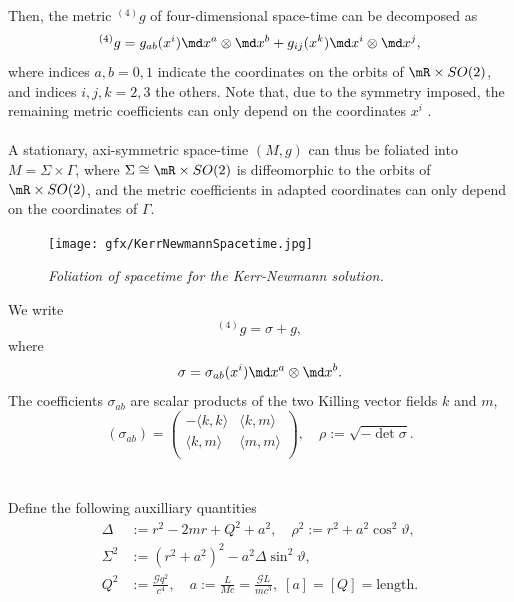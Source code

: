 Then, the metric $^{(4)} g$ of four-dimensional space-time can be decomposed as
\begin{equation}
	^{(4)} g = g_{ab} (x^i) \md x^a \otimes \md x^b + g_{ij} (x^k) \md x^i \otimes \md x^j,
\end{equation}
where indices $a,b=0,1$ indicate the coordinates on the orbits of
$\mR \times SO(2)$, and indices $i, j, k = 2, 3$ the others. Note that, due to the
symmetry imposed, the remaining metric coefficients can only depend
on the coordinates $x^i$ .\\
\\
A stationary, axi-symmetric space-time $(M, g)$ can thus be foliated into
$M =  \Sigma \times \Gamma$, where $\Sigma \cong \mR \times SO(2)$ is diffeomorphic to the orbits of $\mR \times SO(2)$, and
the metric coefficients in adapted coordinates can only depend on the coordinates of $\Gamma$.
\\
\begin{figure}
		\centering
		\texttt{[image: gfx/KerrNewmannSpacetime.jpg]}
		\caption{\itshape Foliation of spacetime for the Kerr-Newmann solution.}
\end{figure}
We write
\begin{equation}
^{(4)}g = \sigma + g,
\end{equation}
where 
\begin{equation}
	\sigma = \sigma_{ab} (x^i) \md x^a \otimes \md x^b .
\end{equation}
The coefficients $\sigma_{ab}$ are scalar products of the two Killing vector fields $k$ and $m$,
\begin{equation}
	(\sigma_{ab}) = 
	\begin{pmatrix}
	-\langle k,k \rangle & \langle k, m \rangle\\
	\langle k,m \rangle & \langle m, m\rangle\\
	\end{pmatrix}, \quad \rho := \sqrt{-\det{\sigma}}.
\end{equation}\\
\\
Define the following auxilliary quantities
\begin{align*}
	\Delta & := r^2- 2mr + Q^2 +a^2, \quad \rho^2 := r^2 +a^2 \cos^2 \vartheta ,\\
	\Sigma^2 &:= (r^2+a^2)^2 -a^2 \Delta \sin^2 \vartheta, \\
	Q^2 &:= \frac{\mathcal{G}q^2}{c^4}, \quad a:= \frac{L}{Mc} = \frac{\mathcal{G}L}{m c^3}, \; [a]=[Q]=\mathrm{length}.	
\end{align*}
